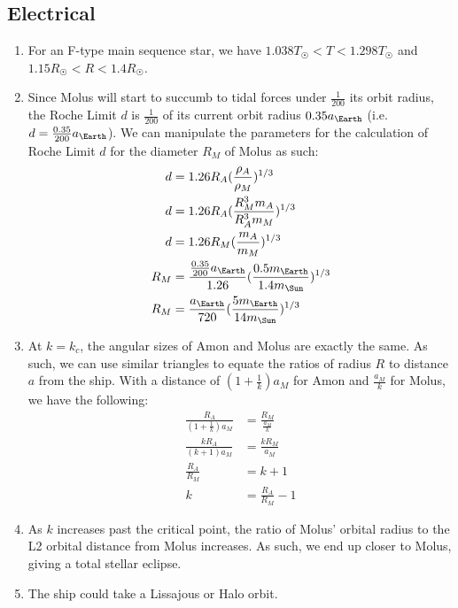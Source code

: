 \documentclass{article}
\begin{document}
\subsection{Electrical}
\begin{enumerate}
\item For an F-type main sequence star, we have $1.038T_\Sun<T<1.298T_\Sun$ and $1.15R_\Sun<R<1.4R_\Sun$.
\item Since Molus will start to succumb to tidal forces under $\frac{1}{200}$ its orbit radius, the Roche Limit $d$ is $\frac{1}{200}$ of its current orbit radius $0.35a_\Earth$ (i.e. $d=\frac{0.35}{200}a_\Earth$). We can manipulate the parameters for the calculation of Roche Limit $d$ for the diameter $R_M$ of Molus as such:
\begin{equation}
\begin{split}
d&=1.26R_A(\frac{\rho_A}{\rho_M})^{1/3}\\
d&=1.26R_A(\frac{R_M^3m_A}{R_A^3m_M})^{1/3}\\
d&=1.26R_M(\frac{m_A}{m_M})^{1/3}\\
R_M&=\frac{\frac{0.35}{200}a_\Earth}{1.26}(\frac{0.5m_\Earth}{1.4m_\Sun})^{1/3}\\
R_M&=\frac{a_\Earth}{720}(\frac{5m_\Earth}{14m_\Sun})^{1/3}\\
\end{split}
\end{equation}
\item At $k=k_c$, the angular sizes of Amon and Molus are exactly the same. As such, we can use similar triangles to equate the ratios of radius $R$ to distance $a$ from the ship. With a distance of $(1+\frac{1}{k})a_M$ for Amon and $\frac{a_M}{k}$ for Molus, we have the following:
\begin{equation}
\begin{split}
\frac{R_A}{(1+\frac{1}{k})a_M}&=\frac{R_M}{\frac{a_M}{k}}\\
\frac{kR_A}{(k+1)a_M}&=\frac{kR_M}{a_M}\\
\frac{R_A}{R_M}&=k+1\\
k&=\frac{R_A}{R_M}-1
\end{split}
\end{equation}
\item As $k$ increases past the critical point, the ratio of Molus' orbital radius to the L2 orbital distance from Molus increases. As such, we end up closer to Molus, giving a total stellar eclipse.
\item The ship could take a Lissajous or Halo orbit.
\end{enumerate}
\end{document}
